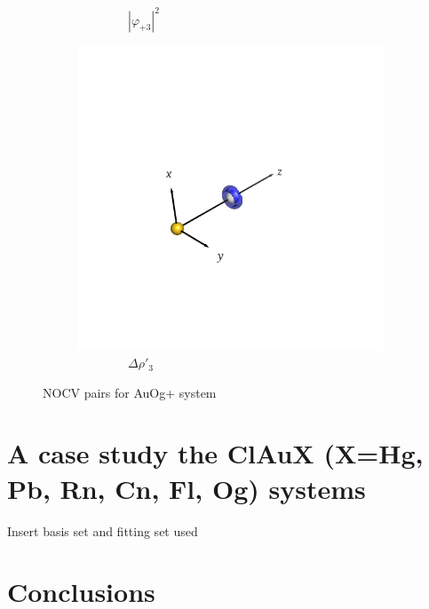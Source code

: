 \documentclass[journal=inoraj,manuscript=article]{achemso}
\begin{document}
\begin{figure}[!h]
\begin{subfigure}[t]{0.32\textwidth}
        \caption*{\ \ \ \ \ \ \ \ $|\varphi_{+3}|^2$} 
    \end{subfigure}
    \hfill
    \begin{subfigure}[t]{0.32\textwidth}
        \centering
        \includegraphics[width=\linewidth]{./AuOg+/pair5.png} 
        \caption*{\ \ \ \ \ \ \ \ $\Delta \rho'_3$} 
    \end{subfigure}

\caption{NOCV pairs for AuOg+ system}
\end{figure}


\section{A case study the ClAuX (X=Hg, Pb, Rn, Cn, Fl, Og) systems  }


Insert basis set and fitting set used 


\section{Conclusions}
\end{document}
